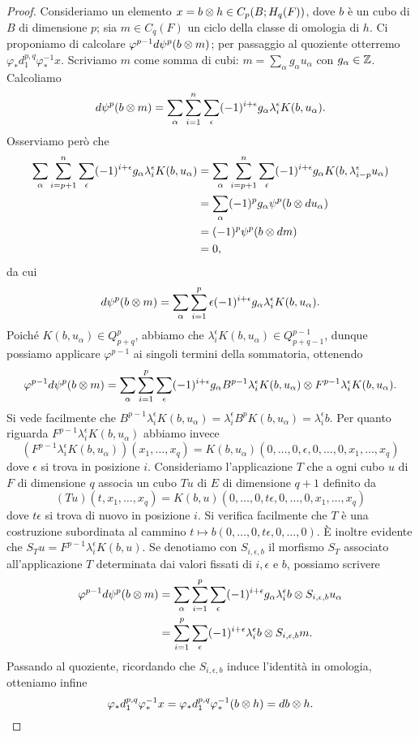 \begin{proof}
Consideriamo un elemento \(x=b\mathbin{\otimes} h\in C_p(B;H_q(F))\), dove \(b\) è un cubo di \(B\) di dimensione \(p\); sia \(m\in C_q(F)\) un ciclo della classe di omologia di \(h\). Ci proponiamo di calcolare \(\varphi^{p-1}d\psi^p(b\mathbin{\otimes} m)\); per passaggio al quoziente otterremo \(\varphi_*d^{p,q}_1\varphi_*^{-1}x\). Scriviamo \(m\) come somma di cubi: \(m=\sum_{\alpha}g_\alpha u_\alpha\) con \(g_\alpha\in\mathbb{Z}\). Calcoliamo
\[
d\psi^p(b\mathbin{\otimes} m)=\sum_\alpha\sum_{i=1}^n\sum_\epsilon(-1)^{i+\epsilon}g_\alpha\lambda^\epsilon_iK(b,u_\alpha).
\]
Osserviamo però che
\begin{align*}
\sum_\alpha\sum_{i=p+1}^n\sum_\epsilon(-1)^{i+\epsilon}g_\alpha\lambda^\epsilon_iK(b,u_\alpha)&=\sum_{\alpha}\sum_{i=p+1}^n\sum_\epsilon(-1)^{i+\epsilon}g_\alpha K(b,\lambda^\epsilon_{i-p}u_\alpha)\\
&=\sum_\alpha(-1)^pg_\alpha\psi^p(b\mathbin{\otimes} du_\alpha)\\
&=(-1)^p\psi^p(b\mathbin{\otimes} dm)\\
&=0,
\end{align*}
da cui
\[
d\psi^p(b\mathbin{\otimes} m)=\sum_\alpha\sum_{i=1}^p\epsilon(-1)^{i+\epsilon}g_\alpha\lambda^\epsilon_iK(b,u_\alpha).
\]
Poiché \(K(b,u_\alpha)\in Q^p_{p+q}\), abbiamo che \(\lambda^\epsilon_iK(b,u_\alpha)\in Q^{p-1}_{p+q-1}\), dunque possiamo applicare \(\varphi^{p-1}\) ai singoli termini della sommatoria, ottenendo
\[
\varphi^{p-1}d\psi^p(b\mathbin{\otimes} m)=\sum_\alpha\sum_{i=1}^p\sum_\epsilon(-1)^{i+\epsilon}g_\alpha B^{p-1}\lambda^\epsilon_iK(b,u_\alpha)\mathbin{\otimes} F^{p-1}\lambda^\epsilon_iK(b,u_\alpha).
\]
Si vede facilmente che \(B^{p-1}\lambda^{\epsilon}_iK(b,u_\alpha)=\lambda^\epsilon_i B^pK(b,u_\alpha)=\lambda^\epsilon_ib\). Per quanto riguarda \(F^{p-1}\lambda^\epsilon_iK(b,u_\alpha)\) abbiamo invece
\[
(F^{p-1}\lambda^\epsilon_iK(b,u_\alpha))(x_1,\ldots,x_q)=K(b,u_\alpha)(0,\ldots,0,\epsilon,0,\ldots,0,x_1,\ldots,x_q)
\]
dove \(\epsilon\) si trova in posizione \(i\). Consideriamo l'applicazione \(T\) che a ogni cubo \(u\) di \(F\) di dimensione \(q\) associa un cubo \(Tu\) di \(E\) di dimensione \(q+1\) definito da
\[
(Tu)(t,x_1,\ldots,x_q)=K(b,u)(0,\ldots,0,t\epsilon,0,\ldots,0,x_1,\ldots,x_q)
\]
dove \(t\epsilon\) si trova di nuovo in posizione \(i\). Si verifica facilmente che \(T\) è una costruzione subordinata al cammino \(t\mapsto b(0,\ldots,0,t\epsilon,0,\ldots,0)\). È inoltre evidente che \(S_Tu=F^{p-1}\lambda^\epsilon_iK(b,u)\). Se denotiamo con \(S_{i,\epsilon,b}\) il morfismo \(S_T\) associato all'applicazione \(T\) determinata dai valori fissati di \(i,\epsilon\) e \(b\), possiamo scrivere
\begin{align*}
\varphi^{p-1}d\psi^p(b\mathbin{\otimes} m)&=\sum_\alpha\sum_{i=1}^p\sum_\epsilon(-1)^{i+\epsilon}g_\alpha\lambda^\epsilon_ib\mathbin{\otimes} S_{i,\epsilon,b}u_\alpha\\
&=\sum_{i=1}^p\sum_\epsilon(-1)^{i+\epsilon}\lambda^\epsilon_ib\mathbin{\otimes} S_{i,\epsilon,b}m.
\end{align*}
Passando al quoziente, ricordando che \(S_{i,\epsilon, b}\) induce l'identità in omologia, otteniamo infine
\[
\varphi_*d^{p,q}_1\varphi_*^{-1}x=\varphi_*d^{p,q}_1\varphi_*^{-1}(b\mathbin{\otimes} h)=db\mathbin{\otimes} h.\qedhere
\]
\end{proof}
